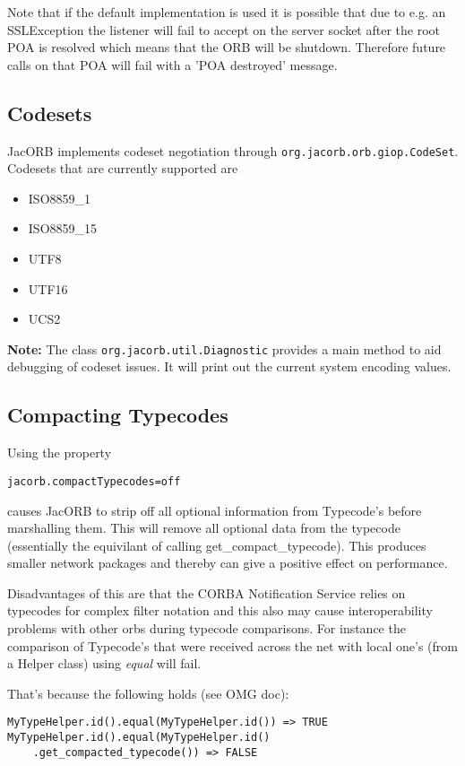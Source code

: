 Note that if the default implementation is used it is possible that due to e.g.
an SSLException the listener will fail to accept on the server socket after the
root POA is resolved which means that the ORB will be shutdown. Therefore future
calls on that POA will fail with a 'POA destroyed' message.

\subsection{Codesets}
JacORB implements codeset negotiation through {\tt org.jacorb.orb.giop.CodeSet}. Codesets
that are currently supported are
\begin{itemize}
\item ISO8859\_1
\item ISO8859\_15
\item UTF8
\item UTF16
\item UCS2
\end{itemize}

\textbf{Note:} The class {\tt org.jacorb.util.Diagnostic} provides a main method to
aid debugging of codeset issues. It will print out the current system encoding values.

\subsection{Compacting Typecodes}
\label{compact-typecode}
Using the property
\begin{verbatim}
jacorb.compactTypecodes=off
\end{verbatim}
causes JacORB to strip off all optional information from Typecode's before marshalling them.
This will remove all optional data from the typecode (essentially the equivilant of
calling get\_compact\_typecode). This produces smaller network packages and thereby can give a positive effect on performance.

Disadvantages of this are that the CORBA Notification Service relies on typecodes for complex
filter notation and this also may cause interoperability problems with other orbs during typecode
comparisons. For instance the comparison of Typecode's that were received across the net with
local one's (from a Helper class) using \emph{equal} will fail.

That's because the following holds (see OMG doc):
\begin{verbatim}
MyTypeHelper.id().equal(MyTypeHelper.id()) => TRUE
MyTypeHelper.id().equal(MyTypeHelper.id()
    .get_compacted_typecode()) => FALSE
\end{verbatim}

